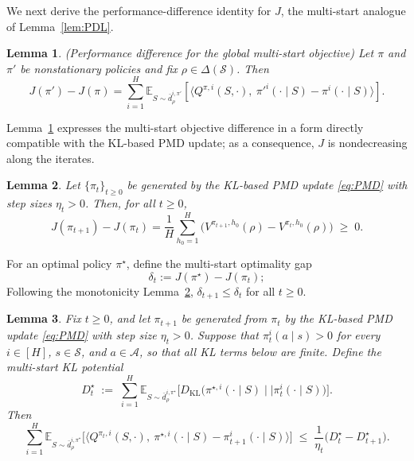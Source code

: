 \documentclass[11pt]{article}
\newtheorem{lem}{Lemma}
\begin{document}
We next derive the performance-difference identity for $J$, the multi-start
analogue of Lemma~\ref{lem:PDL}.
\begin{lem}{(Performance difference for the global multi-start objective)}
\label{lem:PDLJ}
Let $\pi$ and $\pi'$ be nonstationary policies and fix
$\rho\in\Delta(\mathcal S)$. Then
\begin{equation}\label{eq:PDLJ}
J(\pi')-J(\pi)
=
\sum_{i=1}^H
\mathbb E_{S\sim \bar d^{i,{\pi'}}_\rho}\!\left[
\Big\langle Q^{\pi,i}(S,\cdot),\ \pi'^i(\cdot\mid S)-\pi^i(\cdot\mid S)\Big\rangle
\right].
\end{equation}
\end{lem}
Lemma~\ref{lem:PDLJ} expresses the multi-start objective difference in a form
directly compatible with the KL-based PMD update; as a consequence, $J$ is
nondecreasing along the iterates.
\begin{lem}\label{lem:global_multistart_monotone}
Let $\{\pi_t\}_{t\ge 0}$ be generated by the KL-based PMD update
\eqref{eq:PMD} with step sizes $\eta_t>0$. Then, for all $t\ge 0$,
\[
J(\pi_{t+1})-J(\pi_t)
=
\frac{1}{H}\sum_{h_0=1}^H\Big(V^{\pi_{t+1},h_0}(\rho)-V^{\pi_t,h_0}(\rho)\Big)
\;\ge\;0.
\]
\end{lem}
For an optimal policy $\pi^\star$, define the multi-start optimality gap
\begin{equation} \label{eq:delta_with_J}
    \delta_t:=J(\pi^\star)-J(\pi_t);
\end{equation}
Following the monotonicity Lemma~\ref{lem:global_multistart_monotone}, $\delta_{t+1}\le \delta_t$ for
all $t\ge 0$.
\begin{lem}
\label{lem:onestep_multistart_potential}
Fix $t\ge 0$, and let $\pi_{t+1}$ be generated from $\pi_t$ by the KL-based
PMD update \eqref{eq:PMD} with step size $\eta_t>0$. Suppose that
$\pi_t^i(a\mid s)>0$ for every $i\in[H]$, $s\in\mathcal S$, and
$a\in\mathcal A$, so that all KL terms below are finite. Define the
multi-start KL potential
\begin{equation}
\label{eq:Dtstar_global}
D_t^\star
\;:=\;
\sum_{i=1}^H
\mathbb E_{S\sim \bar d^{i,\pi^\star}_\rho}
\Big[
D_{\mathrm{KL}}\!\big(\pi^{\star,i}(\cdot\mid S)\mid\mid\pi_t^i(\cdot\mid S)\big)
\Big].
\end{equation}
Then
\begin{equation}
\label{eq:onestep_multistart_potential}
\sum_{i=1}^H
\mathbb E_{S\sim \bar d^{i,\pi^\star}_\rho}
\Big[
\big\langle Q^{\pi_t,i}(S,\cdot),\ \pi^{\star,i}(\cdot\mid S)-\pi_{t+1}^i(\cdot\mid S)\big\rangle
\Big]
\;\le\;
\frac{1}{\eta_t}\big(D_t^\star-D_{t+1}^\star\big).
\end{equation}
\end{lem}
\end{document}
